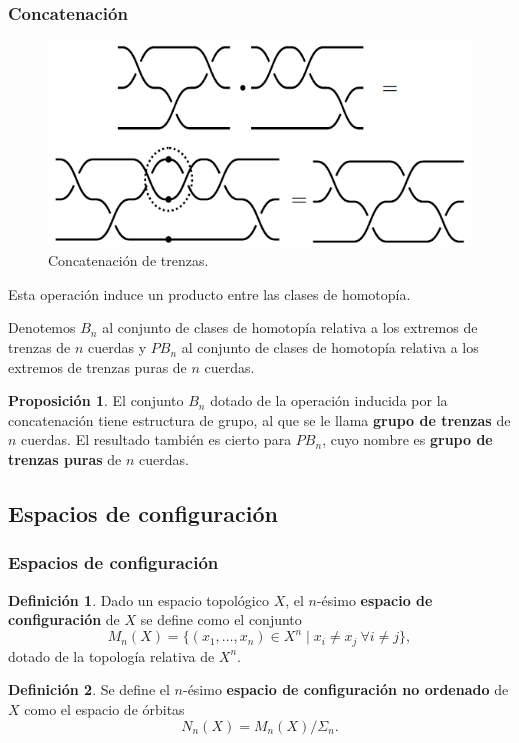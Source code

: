\documentclass{beamer}
\theoremstyle{definition}
\newtheorem{defi}{Definición}
\newtheorem{prop}[teorema]{Proposición}
\begin{document}
\begin{frame}
\frametitle{Concatenación}
\begin{figure}[h!]
\includegraphics[scale=0.6]{Imagenes/Diapconca}
\caption{Concatenación de trenzas.}
\end{figure}
Esta operación induce un producto entre las clases de homotopía.
\end{frame}

\begin{frame}
Denotemos $B_n$ al conjunto de clases de homotopía relativa a los extremos de trenzas de $n$ cuerdas y $PB_n$ al conjunto de clases de homotopía relativa a los extremos de trenzas puras de $n$ cuerdas.

\begin{prop}
El conjunto $B_n$ dotado de la operación inducida por la concatenación tiene estructura de grupo, al que se le llama \textbf{grupo de trenzas} de $n$ cuerdas. El resultado también es cierto para $PB_n$, cuyo nombre es \textbf{grupo de trenzas puras} de $n$ cuerdas. 
\end{prop}
\end{frame}


\subsection{Espacios de configuración}

\begin{frame}
\frametitle{Espacios de configuración}
\begin{defi}
Dado un espacio topológico $X$, el $n$-ésimo \textbf{espacio de configuración} de $X$ se define como el conjunto
$$M_n(X)=\{(x_1,\dots,x_n)\in X^n\mid x_i\neq x_j\ \forall i\neq j\},$$
dotado de la topología relativa de $X^n$.
\end{defi}
\begin{defi}
Se define el $n$-ésimo \textbf{espacio de configuración no ordenado} de $X$ como el espacio de órbitas
$$N_n(X)=M_n(X)/\Sigma_n.$$
\end{defi}
\end{frame}
\end{document}
